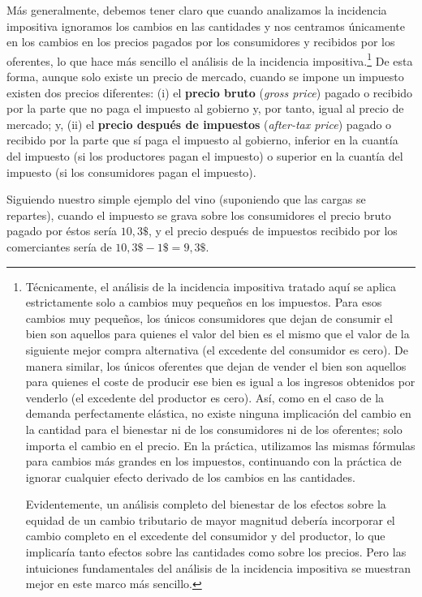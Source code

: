 \documentclass[10pt,a4paper]{article}
\begin{document}
Más generalmente, debemos tener claro que cuando analizamos la incidencia impositiva ignoramos los cambios en las cantidades y nos centramos únicamente en los cambios en los precios pagados por los consumidores y recibidos por los oferentes, lo que hace más sencillo el análisis de la incidencia impositiva.\footnote{%
    Técnicamente, el análisis de la incidencia impositiva tratado aquí se aplica estrictamente solo a cambios muy pequeños en los impuestos. Para esos cambios muy pequeños, los únicos consumidores que dejan de consumir el bien son aquellos para quienes el valor del bien es el mismo que el valor de la siguiente mejor compra alternativa (el excedente del consumidor es cero). De manera similar, los únicos oferentes que dejan de vender el bien son aquellos para quienes el coste de producir ese bien es igual a los ingresos obtenidos por venderlo (el excedente del productor es cero). Así, como en el caso de la demanda perfectamente elástica, no existe ninguna implicación del cambio en la cantidad para el bienestar ni de los consumidores ni de los oferentes; solo importa el cambio en el precio. En la práctica, utilizamos las mismas fórmulas para cambios más grandes en los impuestos, continuando con la práctica de ignorar cualquier efecto derivado de los cambios en las cantidades. 

Evidentemente, un análisis completo del bienestar de los efectos sobre la equidad de un cambio tributario de mayor magnitud debería incorporar el cambio completo en el excedente del consumidor y del productor, lo que implicaría tanto efectos sobre las cantidades como sobre los precios. Pero las intuiciones fundamentales del análisis de la incidencia impositiva se muestran mejor en este marco más sencillo.
} De esta forma, aunque solo existe un precio de mercado, cuando se impone un impuesto existen dos precios diferentes: (i) el \textbf{precio bruto} (\textit{gross price}) pagado o recibido por la parte que no paga el impuesto al gobierno y, por tanto, igual al precio de mercado; y, (ii) el \textbf{precio después de impuestos} (\textit{after-tax price}) pagado o recibido por la parte que sí paga el impuesto al gobierno, inferior en la cuantía del impuesto (si los productores pagan el impuesto) o superior en la cuantía del impuesto (si los consumidores pagan el impuesto). 

Siguiendo nuestro simple ejemplo del vino (suponiendo que las cargas se repartes), cuando el impuesto se grava sobre los consumidores el precio bruto pagado por éstos sería $10,3\$$, y el precio después de impuestos recibido por los comerciantes sería de $10,3\$-1\$=9,3\$$.
\end{document}
